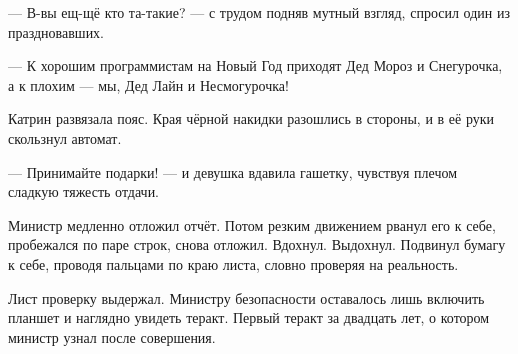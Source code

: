  --- В-вы ещ-щё кто та-такие? --- с трудом подняв мутный взгляд, спросил один из праздновавших.

 --- К хорошим программистам на Новый Год приходят Дед Мороз и Снегурочка, а к плохим --- мы,
 Дед Лайн и Несмогурочка!

 Катрин развязала пояс. Края чёрной накидки разошлись в стороны, и в её руки скользнул автомат.

  --- Принимайте подарки! --- и девушка вдавила гашетку, чувствуя плечом сладкую тяжесть отдачи.

\emptypar



Министр медленно отложил отчёт. Потом резким движением рванул его к себе, пробежался по паре строк, снова отложил.
Вдохнул. Выдохнул. Подвинул бумагу к себе, проводя пальцами по краю листа, словно проверяя на реальность.

Лист проверку выдержал.
Министру безопасности оставалось лишь включить планшет и наглядно увидеть теракт.
Первый теракт за двадцать лет, о котором министр узнал после совершения.






